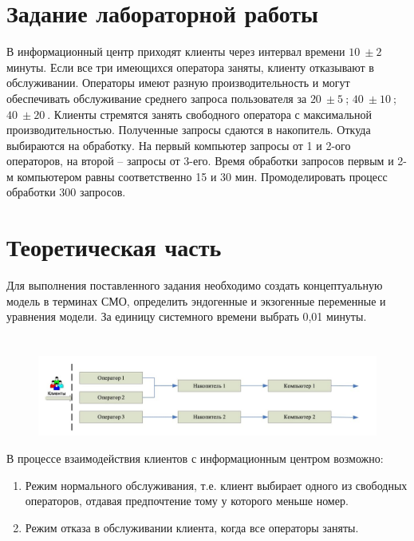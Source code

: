 \documentclass[12pt,a4paper,oneside]{report}
\begin{document}
\section*{Задание лабораторной работы}
\quad В информационный центр приходят клиенты через интервал времени $\SI{10}{} \pm \SI{2}{}$ минуты. Если все три имеющихся оператора заняты, клиенту отказывают в обслуживании. Операторы имеют разную производительность и могут обеспечивать обслуживание среднего запроса пользователя за $\SI{20}{} \pm \SI{5}{}$; $\SI{40}{} \pm \SI{10}{}$; $\SI{40}{} \pm \SI{20}{}$. Клиенты стремятся занять свободного оператора с максимальной производительностью. Полученные запросы сдаются в накопитель. Откуда выбираются на обработку. На первый компьютер запросы от 1 и 2-ого операторов, на второй – запросы от 3-его. Время обработки запросов первым и 2-м компьютером равны соответственно 15 и 30 мин. Промоделировать процесс обработки 300 запросов. 


\section*{Теоретическая часть}
\quad Для выполнения поставленного задания необходимо создать концептуальную модель в терминах СМО, определить эндогенные и экзогенные переменные и уравнения модели. За единицу системного времени выбрать 0,01 минуты.

\section*{}
\begin{figure}[!h]
	\centering
	\includegraphics[scale=0.5]{teor_1.jpg}
	\label{fig:screenshot001}
\end{figure}

\quad В процессе взаимодействия клиентов с информационным центром возможно:

\begin{enumerate} 
  \item Режим нормального обслуживания, т.е. клиент выбирает одного из свободных операторов, отдавая предпочтение тому у которого меньше номер.
  \item Режим отказа в обслуживании клиента, когда все операторы заняты. 
\end{enumerate}
\end{document}
